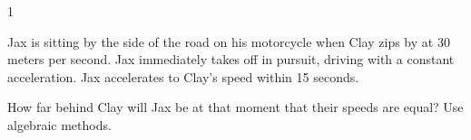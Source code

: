 
\AddToShipoutPicture*{\BackgroundPic}

\addtocounter {ProbNum} {1}

 
{\bf \Large{}} Jax is sitting by the side of the road on his motorcycle when Clay zips by at 30 meters per second.  Jax immediately takes off in pursuit, driving with a constant acceleration.  Jax accelerates to Clay's speed within 15 seconds. \bigskip

How far behind Clay will Jax be at that moment that their speeds are equal?  Use algebraic methods. \paragraph{}
\noindent


\vfill
\newpage